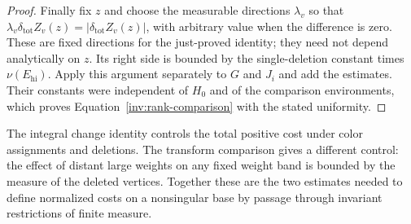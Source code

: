 \begin{proof}
Finally fix $z$ and choose the measurable directions $\lambda_v$ so that
$\lambda_v\delta_{\mathrm{tot}}Z_v(z)=
|\delta_{\mathrm{tot}}Z_v(z)|$, with arbitrary value when the difference
is zero.  These are fixed directions for the just-proved identity; they
need not depend analytically on $z$.  Its right side is bounded by the
single-deletion constant times $\nu(E_{\mathrm{hi}})$.  Apply this
argument separately to $G$ and $J_i$ and add the estimates.  Their
constants were independent of $H_0$ and of the comparison environments,
which proves Equation~\eqref{inv:rank-comparison} with the stated
uniformity.
\end{proof}

The integral change identity controls the total positive cost under
color assignments and deletions.  The transform comparison gives a
different control: the effect of distant large weights on any fixed
weight band is bounded by the measure of the deleted vertices.  Together
these are the two estimates needed to define normalized costs on a
nonsingular base by passage through invariant restrictions of finite measure.
